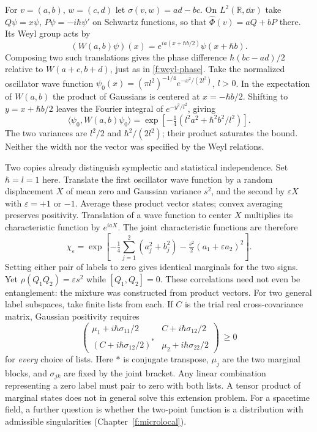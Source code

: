 \begin{example}\label{f:oscillator-state}
For $v=(a,b)$, $w=(c,d)$ let $\sigma(v,w)=ad-bc$. On $L^2(\mathbb R,\dd x)$ take $Q\psi=x\psi$, $P\psi=-i\hbar\psi'$ on Schwartz functions, so that $\widehat\Phi(v)=aQ+bP$ there. Its Weyl group acts by
\[
 (W(a,b)\psi)(x)=e^{ia(x+\hbar b/2)}\psi(x+\hbar b).
\]
Composing two such translations gives the phase difference $\hbar(bc-ad)/2$ relative to $W(a+c,b+d)$, just as in \eqref{f:weyl-phase}. Take the normalized oscillator wave function $\psi_0(x)=(\pi l^2)^{-1/4}e^{-x^2/(2l^2)}$, $l>0$. In the expectation of $W(a,b)$ the product of Gaussians is centered at $x=-\hbar b/2$. Shifting to $y=x+\hbar b/2$ leaves the Fourier integral of $e^{-y^2/l^2}$, giving
\[
 \langle\psi_0,W(a,b)\psi_0\rangle
   =\exp\!\left[-\tfrac14(l^2 a^2+\hbar^2 b^2/l^2)\right].
\]
The two variances are $l^2/2$ and $\hbar^2/(2l^2)$; their product saturates the bound. Neither the width nor the vector was specified by the Weyl relations.
\end{example}

Two copies already distinguish symplectic and statistical independence. Set $\hbar=l=1$ here. Translate the first oscillator wave function by a random displacement $X$ of mean zero and Gaussian variance $s^2$, and the second by $\varepsilon X$ with $\varepsilon=+1$ or $-1$. Average these product vector states; convex averaging preserves positivity. Translation of a wave function to center $X$ multiplies its characteristic function by $e^{iaX}$. The joint characteristic functions are therefore
\[
 \chi_\varepsilon=\exp\!\left[-\tfrac14\sum_{j=1}^2(a_j^2+b_j^2)
                          -\tfrac{s^2}{2}(a_1+\varepsilon a_2)^2\right].
\]
Setting either pair of labels to zero gives identical marginals for the two signs. Yet $\rho(Q_1Q_2)=\varepsilon s^2$ while $[Q_1,Q_2]=0$. These correlations need not even be entanglement: the mixture was constructed from product vectors. For two general label subspaces, take finite lists from each. If $C$ is the trial real cross-covariance matrix, Gaussian positivity requires
\[
 \begin{pmatrix}
  \mu_1+i\hbar\sigma_{11}/2 & C+i\hbar\sigma_{12}/2\\[2pt]
  (C+i\hbar\sigma_{12}/2)^* & \mu_2+i\hbar\sigma_{22}/2
 \end{pmatrix}\ \ge 0
\]
for \emph{every} choice of lists. Here $*$ is conjugate transpose, $\mu_j$ are the two marginal blocks, and $\sigma_{jk}$ are fixed by the joint bracket. Any linear combination representing a zero label must pair to zero with both lists. A tensor product of marginal states does not in general solve this extension problem. For a spacetime field, a further question is whether the two-point function is a distribution with admissible singularities (Chapter~\ref{f:microlocal}).

